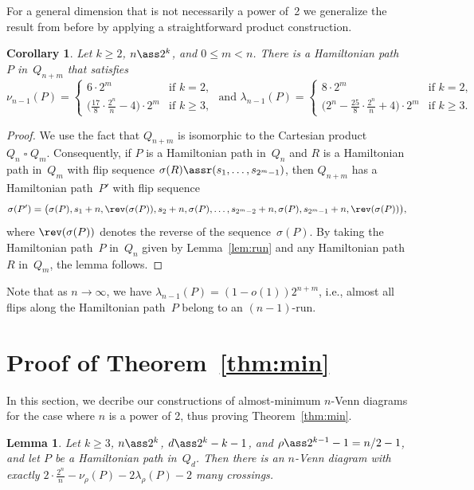 \documentclass[a4paper,11pt,reqno]{amsart}
\newtheorem{lemma}[theorem]{Lemma}
\newtheorem{corollary}[theorem]{Corollary}
\begin{document}
For a general dimension that is not necessarily a power of~2 we generalize the result from before by applying a straightforward product construction.

\begin{corollary}
\label{cor:run}
Let $k\geq 2$, $n\ass 2^k$, and $0\le m <n$.
There is a Hamiltonian path~$P$ in~$Q_{n+m}$ that satisfies
\[ \nu_{n-1}(P)=\begin{cases}
               6\cdot 2^m & \text{if } k=2, \\
               \big(\frac{17}{8}\cdot\frac{2^n}{n}-4\big)\cdot 2^m & \text{if } k\ge 3,
               \end{cases} \text{   and   }
\lambda_{n-1}(P)=\begin{cases}
                 8\cdot 2^m & \text{if } k=2, \\
                 \big(2^n-\frac{25}{8}\cdot\frac{2^n}{n}+4\big)\cdot 2^m & \text{if } k\ge 3.
                 \end{cases} \]
\end{corollary}

\begin{proof}
We use the fact that $Q_{n+m}$ is isomorphic to the Cartesian product $Q_n \mathbin{\square} Q_m$.
Consequently, if $P$ is a Hamiltonian path in~$Q_n$ and $R$ is a Hamiltonian path in~$Q_m$ with flip sequence $\sigma(R)\assr(s_1,\dots,s_{2^m-1})$, then $Q_{n+m}$ has a Hamiltonian path~$P'$ with flip sequence
\[ \sigma(P')=\big(\sigma(P),s_1+n,\rev(\sigma(P)),s_2+n,\sigma(P),\ldots,s_{2^m-2}+n,\sigma(P),s_{2^m-1}+n,\rev(\sigma(P))\big), \]
where $\rev(\sigma(P))$ denotes the reverse of the sequence~$\sigma(P)$.
By taking the Hamiltonian path~$P$ in~$Q_n$ given by Lemma~\ref{lem:run} and any Hamiltonian path $R$ in~$Q_m$, the lemma follows.
\end{proof}

Note that as $n\rightarrow \infty$, we have $\lambda_{n-1}(P)=(1-o(1))2^{n+m}$, i.e., almost all flips along the Hamiltonian path~$P$ belong to an $(n-1)$-run.


\section{Proof of Theorem~\ref{thm:min}}

In this section, we decribe our constructions of almost-minimum $n$-Venn diagrams for the case where $n$ is a power of 2, thus proving Theorem~\ref{thm:min}.

\begin{lemma}
\label{lem:min}
Let $k\geq 3$, $n\ass 2^k$, $d\ass 2^k-k-1$, and $\rho\ass 2^{k-1}-1=n/2-1$, and let $P$ be a Hamiltonian path in~$Q_d$.
Then there is an $n$-Venn diagram with exactly $2\cdot\frac{2^n}{n}-\nu_\rho(P)-2\lambda_\rho(P)-2$ many crossings.
\end{lemma}
\end{document}
